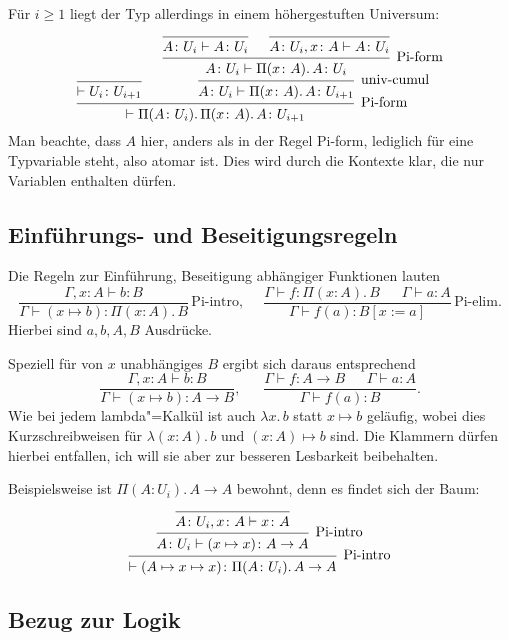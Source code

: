 Für $i\ge 1$ liegt der Typ allerdings in einem höhergestuften Universum:
\[\begin{prooftree}
  \infer0{\vdash\typeuniv_i\colon\typeuniv_{i+1}}
      \infer0{A\colon\typeuniv_i\vdash A\colon\typeuniv_i}
      \infer0{A\colon\typeuniv_i,x\colon A\vdash A\colon\typeuniv_i}
    \infer2[Pi-form]{A\colon\typeuniv_i\vdash\Pi(x\colon A).\, A\colon\typeuniv_i}
  \infer1[univ-cumul]{A\colon\typeuniv_i\vdash\Pi(x\colon A).\, A\colon\typeuniv_{i+1}}
\infer2[Pi-form]{\vdash\Pi(A\colon\typeuniv_i).\, \Pi(x\colon A).\, A\colon\typeuniv_{i+1}}
\end{prooftree}\]
Man beachte, dass $A$ hier, anders als in der Regel Pi-form, lediglich
für eine Typvariable steht, also atomar ist. Dies wird durch die
Kontexte klar, die nur Variablen enthalten dürfen.

\subsection{Einführungs- und Beseitigungsregeln}

Die Regeln zur Einführung, Beseitigung abhängiger Funktionen lauten
\[\dfrac{\Gamma,x\colon A\vdash b\colon B}
{\Gamma\vdash (x\mapsto b)\colon\Pi(x\colon A).\, B}\,\text{Pi-intro},\quad\;
\dfrac{\Gamma\vdash f\colon\Pi(x\colon A).\,B\quad\;\;\Gamma\vdash a\colon A}
{\Gamma\vdash f(a)\colon B[x:=a]}\,\text{Pi-elim}.\]
Hierbei sind $a,b,A,B$ Ausdrücke.

Speziell für von $x$ unabhängiges $B$ ergibt sich daraus entsprechend
\[\dfrac{\Gamma,x\colon A\vdash b\colon B}
{\Gamma\vdash (x\mapsto b)\colon A\to B},\quad\;\;
\dfrac{\Gamma\vdash f\colon A\to B\quad\;\;\Gamma\vdash a\colon A}
{\Gamma\vdash f(a)\colon B}.\]
Wie bei jedem lambda"=Kalkül ist auch $\lambda x.\,b$ statt $x\mapsto b$
geläufig, wobei dies Kurzschreibweisen für $\lambda(x\colon A).\,b$ und
$(x\colon A)\mapsto b$ sind. Die Klammern dürfen hierbei entfallen, ich
will sie aber zur besseren Lesbarkeit beibehalten.

Beispielsweise ist $\Pi(A\colon U_i).\, A\to A$ bewohnt, denn es findet sich der Baum:
\[\begin{prooftree}
    \infer0{A\colon U_i,x\colon A\vdash x\colon A}
  \infer1[Pi-intro]{A\colon U_i\vdash (x\mapsto x)\colon A\to A}
\infer1[Pi-intro]{\vdash (A\mapsto x\mapsto x)\colon\Pi(A\colon U_i).\,A\to A}
\end{prooftree}\]

\subsection{Bezug zur Logik}

